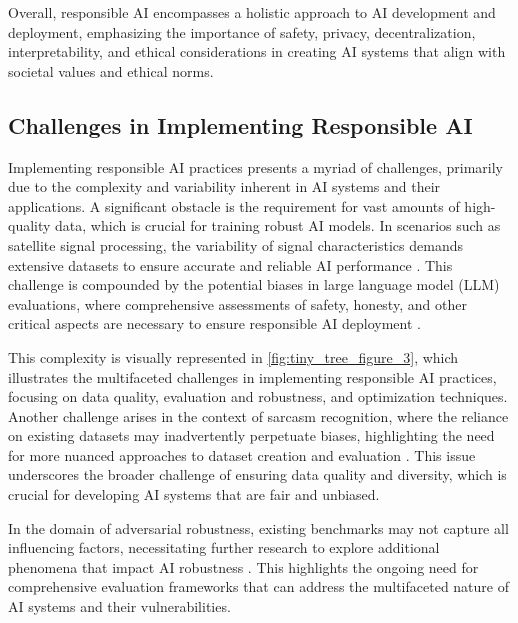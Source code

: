 Overall, responsible AI encompasses a holistic approach to AI development and deployment, emphasizing the importance of safety, privacy, decentralization, interpretability, and ethical considerations in creating AI systems that align with societal values and ethical norms.




\subsection{Challenges in Implementing Responsible AI} \label{subsec:Challenges in Implementing Responsible AI}

Implementing responsible AI practices presents a myriad of challenges, primarily due to the complexity and variability inherent in AI systems and their applications. A significant obstacle is the requirement for vast amounts of high-quality data, which is crucial for training robust AI models. In scenarios such as satellite signal processing, the variability of signal characteristics demands extensive datasets to ensure accurate and reliable AI performance \cite{oligeri2020pastaiphysicallayerauthenticationsatellite}. This challenge is compounded by the potential biases in large language model (LLM) evaluations, where comprehensive assessments of safety, honesty, and other critical aspects are necessary to ensure responsible AI deployment \cite{zheng2023judging}.

This complexity is visually represented in \autoref{fig:tiny_tree_figure_3}, which illustrates the multifaceted challenges in implementing responsible AI practices, focusing on data quality, evaluation and robustness, and optimization techniques. Another challenge arises in the context of sarcasm recognition, where the reliance on existing datasets may inadvertently perpetuate biases, highlighting the need for more nuanced approaches to dataset creation and evaluation \cite{nimase2024morecontextshelpsarcasm}. This issue underscores the broader challenge of ensuring data quality and diversity, which is crucial for developing AI systems that are fair and unbiased.

In the domain of adversarial robustness, existing benchmarks may not capture all influencing factors, necessitating further research to explore additional phenomena that impact AI robustness \cite{lee2020rethinkingempiricalevaluationadversarial}. This highlights the ongoing need for comprehensive evaluation frameworks that can address the multifaceted nature of AI systems and their vulnerabilities.

